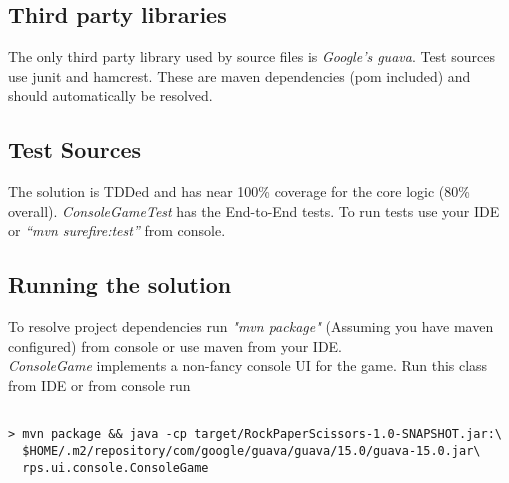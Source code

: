 \documentclass[a4paper]{article}
\begin{document}
\subsection{Third party libraries}
The only third party library used by source files is \emph{Google's guava}. Test sources use junit and hamcrest. These are maven dependencies (pom included) and should automatically be resolved.

\subsection{Test Sources}
The solution is TDDed and has near 100\% coverage for the core logic (80\% overall). \emph{ConsoleGameTest} has the End-to-End tests. To run tests use your IDE or \textit{\emph{``mvn surefire:test''}} from console.

\subsection{Running the solution}
To resolve project dependencies run \emph{"mvn package"} (Assuming you have maven configured) from console or use maven from your IDE.\\
\emph{ConsoleGame} implements a non-fancy console UI for the game. Run this class from IDE or from console run
\begin{verbatim}

> mvn package && java -cp target/RockPaperScissors-1.0-SNAPSHOT.jar:\
  $HOME/.m2/repository/com/google/guava/guava/15.0/guava-15.0.jar\
  rps.ui.console.ConsoleGame
  
\end{verbatim}
 
\end{document}
